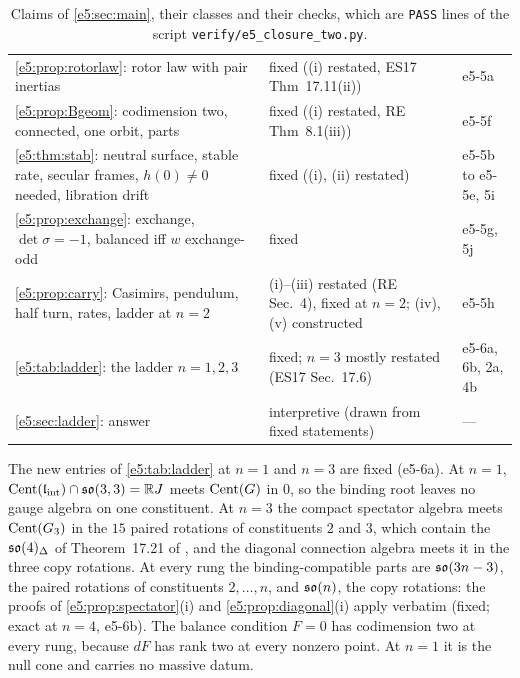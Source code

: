 \begin{table}[htbp]
\begin{tabular}{@{}>{\raggedright\arraybackslash}p{8.0cm}>{\raggedright\arraybackslash}p{4.7cm}>{\raggedright\arraybackslash}p{2.1cm}@{}}
\cref{e5:prop:rotorlaw}: rotor law with pair inertias & fixed ((i) restated, ES17 Thm~17.11(ii)) & e5-5a\\
\cref{e5:prop:Bgeom}: codimension two, connected, one orbit, parts & fixed ((i) restated, RE Thm~8.1(iii)) & e5-5f\\
\cref{e5:thm:stab}: neutral surface, stable rate, secular frames, $h(0)\neq0$ needed, libration drift & fixed ((i), (ii) restated) & e5-5b to e5-5e, 5i\\
\cref{e5:prop:exchange}: exchange, $\det\sigma=-1$, balanced iff $w$ exchange-odd & fixed & e5-5g, 5j\\
\cref{e5:prop:carry}: Casimirs, pendulum, half turn, rates, ladder at $n=2$ & (i)--(iii) restated (RE Sec.~4), fixed at $n=2$; (iv), (v) constructed & e5-5h\\
\cref{e5:tab:ladder}: the ladder $n=1,2,3$ & fixed; $n=3$ mostly restated (ES17 Sec.~17.6) & e5-6a, 6b, 2a, 4b\\
\cref{e5:sec:ladder}: answer & interpretive (drawn from fixed statements) & ---\\
\bottomrule
\end{tabular}
\caption{Claims of \cref{e5:sec:main}, their classes and their checks, which are \texttt{PASS} lines of the script
\texttt{verify/e5\_closure\_two.py}.}
\label{e5:tab:claims}
\end{table}

The new entries of \cref{e5:tab:ladder} at $n=1$ and $n=3$ are fixed (e5-6a). At $n=1$, $\operatorname{Cent}(\mathfrak l_{\rm int})\cap\mathfrak{so}(3,3)=\mathbb{R} J$ meets $\operatorname{Cent}(G)$ in $0$, so the
binding root leaves no gauge algebra on one constituent. At $n=3$ the compact spectator algebra meets $\operatorname{Cent}(G_3)$ in the $15$ paired rotations of
constituents $2$ and $3$, which contain the $\mathfrak{so}(4)_\Delta$ of Theorem~17.21 of \cite{ES17}, and the diagonal connection algebra meets it in the three copy
rotations. At every rung the binding-compatible parts are $\mathfrak{so}(3n-3)$, the paired rotations of constituents $2,\dots,n$, and $\mathfrak{so}(n)$, the copy
rotations: the proofs of \cref{e5:prop:spectator}(i) and \cref{e5:prop:diagonal}(i) apply verbatim (fixed; exact at $n=4$, e5-6b). The balance condition $F=0$ has codimension two at every rung, because $dF$
has rank two at every nonzero point. At $n=1$ it is the null cone and carries no massive datum.

